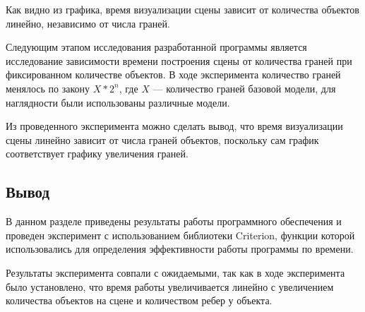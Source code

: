 
Как видно из графика, время визуализации сцены зависит от количества объектов линейно, независимо от числа граней.

Следующим этапом исследования разработанной программы является исследование зависимости времени построения сцены от количества граней при фиксированном количестве объектов. В ходе эксперимента количество граней менялось по закону $X * 2^n$, где $X$ --- количество граней базовой модели, для наглядности были использованы различные модели. 

Из проведенного эксперимента можно сделать вывод, что время визуализации сцены линейно зависит от числа граней объектов, поскольку сам график соответствует графику увеличения граней.

\subsection*{Вывод}
В данном разделе приведены результаты работы программного
обеспечения и проведен эксперимент с использованием библиотеки Criterion,
функции которой использовались для определения эффективности работы
программы по времени.

Результаты эксперимента совпали с ожидаемыми, так как в ходе
эксперимента было установлено, что время работы увеличивается линейно с увеличением
количества объектов на сцене и количеством ребер у объекта.
